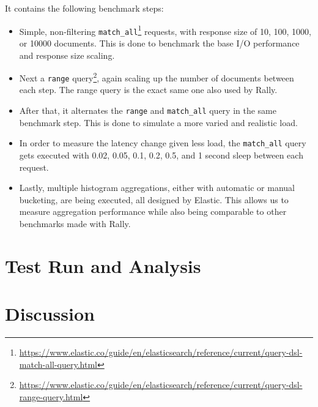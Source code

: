 It contains the following benchmark steps:
\begin{itemize}
  \item Simple, non-filtering \texttt{match\_all}\footnote{\url{https://www.elastic.co/guide/en/elasticsearch/reference/current/query-dsl-match-all-query.html}} requests, with response size of 10, 100, 1000, or 10000 documents. This is done to benchmark the base I/O performance and response size scaling.
  \item Next a \texttt{range} query\footnote{\url{https://www.elastic.co/guide/en/elasticsearch/reference/current/query-dsl-range-query.html}}, again scaling up the number of documents between each step. The range query is the exact same one also used by Rally.
  \item After that, it alternates the \texttt{range} and \texttt{match\_all} query in the same benchmark step. This is done to simulate a more varied and realistic load.
  \item In order to measure the latency change given less load, the \texttt{match\_all} query gets executed with 0.02, 0.05, 0.1, 0.2, 0.5, and 1 second sleep between each request.
  \item Lastly, multiple histogram aggregations, either with automatic or manual bucketing, are being executed, all designed by Elastic. This allows us to measure aggregation performance while also being comparable to other benchmarks made with Rally.
\end{itemize}

\section{Test Run and Analysis}

\section{Discussion}

